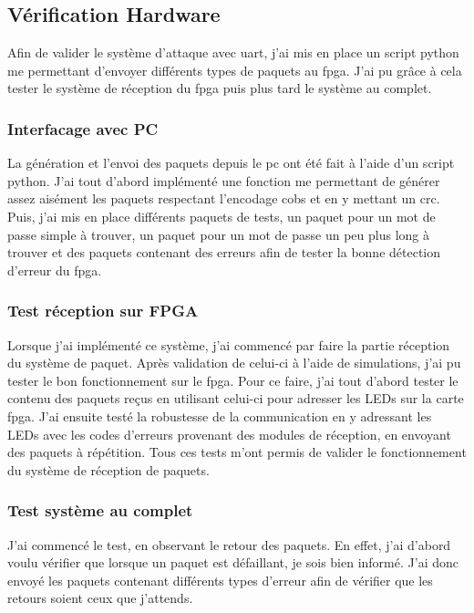 \subsection{Vérification Hardware}

Afin de valider le système d'attaque avec \gls{uart}, j'ai mis en place un script python me permettant d'envoyer différents types de paquets au \gls{fpga}.
J'ai pu grâce à cela tester le système de réception du \gls{fpga} puis plus tard le système au complet.

\subsubsection{Interfacage avec PC}

La génération et l'envoi des paquets depuis le \gls{pc} ont été fait à l'aide d'un script python.
J'ai tout d'abord implémenté une fonction me permettant de générer assez aisément les paquets respectant l'encodage \gls{cobs} et en y mettant un \gls{crc}.
Puis, j'ai mis en place différents paquets de tests, 
un paquet pour un mot de passe simple à trouver,  un paquet pour un mot de passe un peu plus long à trouver et des paquets contenant des erreurs afin de tester la bonne détection d'erreur du \gls{fpga}.

\subsubsection{Test réception sur FPGA}

Lorsque j'ai implémenté ce système, j'ai commencé par faire la partie réception du système de paquet.
Après validation de celui-ci à l'aide de simulations, j'ai pu tester le bon fonctionnement sur le \gls{fpga}.
Pour ce faire, j'ai tout d'abord tester le contenu des paquets reçus en utilisant celui-ci pour adresser les LEDs sur la carte \gls{fpga}.
J'ai ensuite testé la robustesse de la communication en y adressant les LEDs avec les codes d'erreurs provenant des modules de réception, en envoyant des paquets à répétition.
Tous ces tests m'ont permis de valider le fonctionnement du système de réception de paquets.

\subsubsection{Test système au complet}

J'ai commencé le test, en observant le retour des paquets. 
En effet, j'ai d'abord voulu vérifier que lorsque un paquet est défaillant, je sois bien informé.
J'ai donc envoyé les paquets contenant différents types d'erreur afin de vérifier que les retours soient ceux que j'attends.

